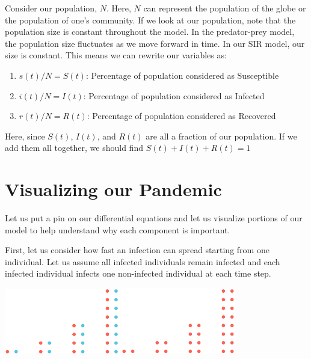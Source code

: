 \documentclass{amsart}
\theoremstyle{definition}
\numberwithin{equation}{section}
\begin{document}
\begin{sansmath}
Consider our population, $N$. Here, $N$ can represent the population of the globe or the population of one's community. If we look at our population, note that the population size is constant throughout the model. In the predator-prey model, the population size fluctuates as we move forward in time. In our SIR model, our size is constant. This means we can rewrite our variables as:
%
\begin{enumerate}
  \item $s(t)/N = S(t)$: Percentage of population considered as Susceptible
  \item $i(t)/N = I(t)$: Percentage of population considered as Infected
  \item $r(t)/N = R(t)$: Percentage of population considered as Recovered
\end{enumerate}

Here, since $S(t)$, $I(t)$, and $R(t)$ are all a fraction of our population. If we add them all together, we should find $S(t) + I(t) + R(t) = 1$

\section{Visualizing our Pandemic}

Let us put a pin on our differential equations and let us visualize portions of our model to help understand why each component is important.

First, let us consider how fast an infection can spread starting from one individual. Let us assume all infected individuals remain infected and each infected individual infects one non-infected individual at each time step.

\begin{center}
  \includegraphics[width=5cm]{DotsPre}
  \quad
  \includegraphics[width=5cm]{DotsPost}
\end{center}


\end{sansmath}
\end{document}
